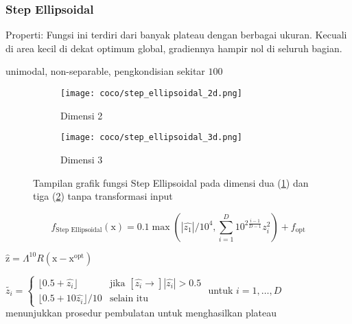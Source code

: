 \subsubsection*{Step Ellipsoidal}
\noindent Properti:
Fungsi ini terdiri dari banyak plateau dengan berbagai ukuran. Kecuali di area kecil di dekat optimum global, gradiennya hampir nol di seluruh bagian.
\begin{packed_item}
  \item unimodal, non-separable, pengkondisian sekitar $100$
\end{packed_item}
\begin{figure}[H]
	\centering
	\begin{subfigure}[b]{0.4\textwidth}
		\centering
		\texttt{[image: coco/step\_ellipsoidal\_2d.png]}
		\caption{Dimensi 2}
		\label{fig:step_ellipsoidal_coco_2d}
	\end{subfigure}
	\hfill
	\begin{subfigure}[b]{0.4\textwidth}
		\centering
		\texttt{[image: coco/step\_ellipsoidal\_3d.png]}
		\caption{Dimensi 3}
		\label{fig:step_ellipsoidal_coco_3d}
	\end{subfigure}
	\caption{Tampilan grafik fungsi Step Ellipsoidal pada dimensi dua (\cref{fig:step_ellipsoidal_coco_2d}) dan tiga (\cref{fig:step_ellipsoidal_coco_3d}) tanpa transformasi input}
	\label{fig:step_ellipsoidal_coco}
\end{figure}
\begin{equation}
  f_{\text{Step Ellipsoidal}}(\mathrm{x})=0.1\max(|\hat{z_1}|/10^4,\sum_{i=1}^{D}10^{2\frac{i-1}{D-1}}z_i^2)+f_{\text{opt}}
\end{equation}
\begin{packed_item}
    \item $\hat{\mathrm{z}}=\Lambda^{10}R(\mathrm{x}-\mathrm{x}^{\text{opt}})$
    \item $\tilde{z_i}=\begin{cases}
      \lfloor 0.5+\hat{z_i}\rfloor & \text{jika }[\hat{z_i}\to]|\hat{z_i}| > 0.5\\
      \lfloor 0.5+10\hat{z_i}\rfloor/10 & \text{selain itu}
    \end{cases}$ untuk $i=1,\ldots,D$\\menunjukkan prosedur pembulatan untuk menghasilkan plateau
\end{packed_item}

